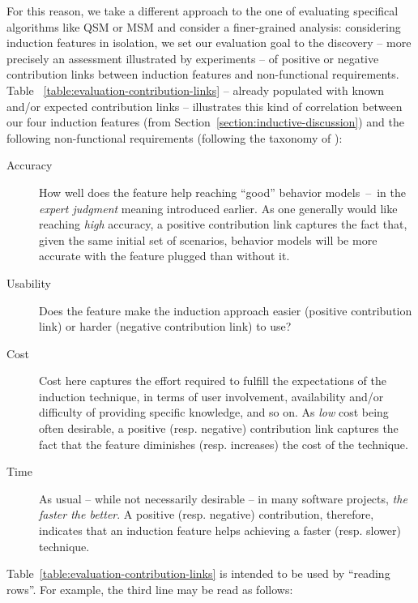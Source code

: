 For this reason, we take a different approach to the one of evaluating specifical algorithms like QSM or MSM and consider a finer-grained analysis: considering induction features in isolation, we set our evaluation goal to the discovery -- more precisely an assessment illustrated by experiments -- of positive or negative contribution links between induction features and non-functional requirements. Table ~\ref{table:evaluation-contribution-links} -- already populated with known and/or expected contribution links -- illustrates this kind of correlation between our four induction features (from Section~\ref{section:inductive-discussion}) and the following non-functional requirements (following the taxonomy of \cite{VanLamsweerde:2009}):

\begin{description}

\item[Accuracy] How well does the feature help reaching ``good'' behavior models~--~in the \emph{expert judgment} meaning introduced earlier. As one generally would like reaching \emph{high} accuracy, a positive contribution link captures the fact that, given the same initial set of scenarios, behavior models will be more accurate with the feature plugged than without it. 

\item[Usability] Does the feature make the induction approach easier (positive contribution link) or harder (negative contribution link) to use?

\item[Cost] Cost here captures the effort required to fulfill the expectations of the induction technique, in terms of user involvement, availability and/or difficulty of providing specific knowledge, and so on. As \emph{low} cost being often desirable, a positive (resp. negative) contribution link captures the fact that the feature diminishes (resp. increases) the cost of the technique.

\item[Time] As usual -- while not necessarily desirable -- in many software projects, \emph{the faster the better}. A positive (resp. negative) contribution, therefore, indicates that an induction feature helps achieving a faster (resp. slower) technique.

\end{description}

Table~\ref{table:evaluation-contribution-links} is intended to be used by ``reading rows''. For example, the third line may be read as follows:

